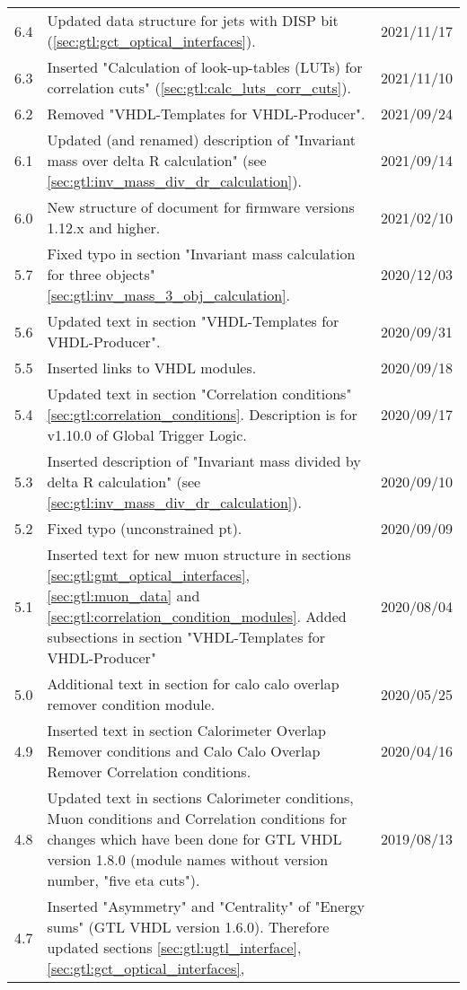 \begin{longtable}{|c|p{}|c|}
6.4 & Updated data structure for jets with DISP bit (\ref{sec:gtl:gct_optical_interfaces}). & 2021/11/17\\
6.3 & Inserted "Calculation of look-up-tables (LUTs) for correlation cuts" (\ref{sec:gtl:calc_luts_corr_cuts}). & 2021/11/10\\
6.2 & Removed "VHDL-Templates for VHDL-Producer". & 2021/09/24\\
6.1 & Updated (and renamed) description of "Invariant mass over delta R calculation" (see \ref{sec:gtl:inv_mass_div_dr_calculation}). & 2021/09/14\\
6.0 & New structure of document for firmware versions 1.12.x and higher. & 2021/02/10\\
5.7 & Fixed typo in section "Invariant mass calculation for three objects" \ref{sec:gtl:inv_mass_3_obj_calculation}. & 2020/12/03\\
5.6 & Updated text in section "VHDL-Templates for VHDL-Producer". & 2020/09/31\\
5.5 & Inserted links to VHDL modules. & 2020/09/18\\
5.4 & Updated text in section "Correlation conditions" \ref{sec:gtl:correlation_conditions}. Description is for v1.10.0 of Global Trigger Logic. & 2020/09/17\\
5.3 & Inserted description of "Invariant mass divided by delta R calculation" (see \ref{sec:gtl:inv_mass_div_dr_calculation}). & 2020/09/10\\
5.2 & Fixed typo (unconstrained pt). & 2020/09/09\\
5.1 & Inserted text for new muon structure in sections \ref{sec:gtl:gmt_optical_interfaces}, \ref{sec:gtl:muon_data} and \ref{sec:gtl:correlation_condition_modules}. Added subsections in section "VHDL-Templates for VHDL-Producer" & 2020/08/04\\
5.0 & Additional text in section for calo calo overlap remover condition module. & 2020/05/25\\
4.9 & Inserted text in section Calorimeter Overlap Remover conditions and Calo Calo Overlap Remover Correlation conditions. & 2020/04/16\\
4.8 & Updated text in sections Calorimeter conditions, Muon conditions and Correlation conditions for changes which have been done for GTL VHDL version 1.8.0 (module names without version number, "five eta cuts"). & 2019/08/13\\
4.7 & Inserted "Asymmetry" and "Centrality" of "Energy sums" (GTL VHDL version 1.6.0). Therefore updated sections \ref{sec:gtl:ugtl_interface}, \ref{sec:gtl:gct_optical_interfaces},

\end{longtable}
